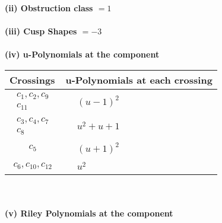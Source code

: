 \documentclass[1p]{elsarticle_modified}
\theoremstyle{definition}
\begin{document}
\flushleft \textbf{(ii) Obstruction class $= 1$}\\~\\
\flushleft \textbf{(iii) Cusp Shapes $= -3$}\\~\\
\newpage\renewcommand{\arraystretch}{1}
\flushleft \textbf{(iv) u-Polynomials at the component}\newline \\
\begin{tabular}{m{50pt}|m{274pt}}
Crossings & \hspace{64pt}u-Polynomials at each crossing \\
\hline $$\begin{aligned}c_{1},c_{2},c_{9}\\c_{11}\end{aligned}$$&$\begin{aligned}
&(u-1)^2
\end{aligned}$\\
\hline $$\begin{aligned}c_{3},c_{4},c_{7}\\c_{8}\end{aligned}$$&$\begin{aligned}
&u^2+u+1
\end{aligned}$\\
\hline $$\begin{aligned}c_{5}\end{aligned}$$&$\begin{aligned}
&(u+1)^2
\end{aligned}$\\
\hline $$\begin{aligned}c_{6},c_{10},c_{12}\end{aligned}$$&$\begin{aligned}
&u^2
\end{aligned}$\\
\hline
\end{tabular}\\~\\
\newpage\renewcommand{\arraystretch}{1}
\flushleft \textbf{(v) Riley Polynomials at the component}\newline \\
\end{document}
